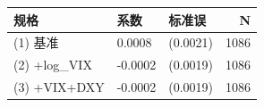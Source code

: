 \caption{MiCA — 加入宏观控制变量稳健性检验（7D_EWMA_Intraday_Price_Volatility）}
\begin{tabular}{lllr}
\toprule
规格 & 系数 & 标准误 & N \\
\midrule
(1) 基准 & 0.0008 & (0.0021) & 1086 \\
(2) +log_VIX & -0.0002 & (0.0019) & 1086 \\
(3) +VIX+DXY & -0.0002 & (0.0019) & 1086 \\
\bottomrule
\end{tabular}
